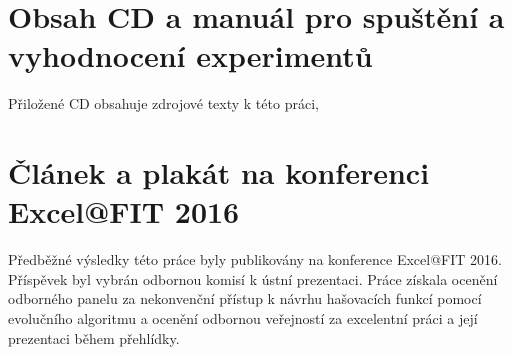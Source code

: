 \chapter{Obsah CD a manuál pro spuštění a vyhodnocení experimentů}

Přiložené CD obsahuje zdrojové texty k této práci, 


\chapter{Článek a plakát na konferenci Excel@FIT 2016}
Předběžné výsledky této práce byly publikovány na konference Excel@FIT 2016. Příspěvek byl vybrán
odbornou komisí k ústní prezentaci. Práce získala ocenění odborného panelu za nekonvenční přístup k návrhu hašovacích
funkcí pomocí evolučního algoritmu a ocenění odbornou veřejností za excelentní práci a její prezentaci během přehlídky.

\newpage
\begin{figure}[!ht]
	\centering 
	
\end{figure}
\newpage
\begin{figure}[!ht]
	\centering 
	
\end{figure}
\newpage
\begin{figure}[!ht]
	\centering 
	
\end{figure}
\newpage
\begin{figure}[!ht]
	\centering 
	
\end{figure}
\newpage
\begin{figure}[!ht]
	\centering 
	
\end{figure}
\newpage
\begin{figure}[!ht]
	\centering 
	
\end{figure}

